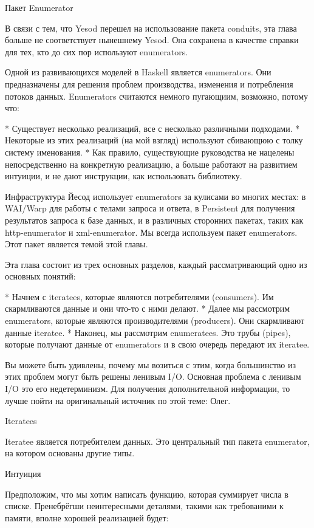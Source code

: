 Пакет Enumerator

В связи с тем, что Yesod перешел на использование пакета conduits, эта глава больше не соответствует нынешнему Yesod. Она сохранена в качестве справки для тех, кто до сих пор используют enumerators.

Одной из развивающихся моделей в Haskell является enumerators. Они предназначены для решения проблем производства, изменения и потребления потоков данных. Enumerators считаются немного пугающиим, возможно, потому что:

* Существует несколько реализаций, все с несколько различными подходами.
* Некоторые из этих реализаций (на мой взгляд) используют сбивающюю с толку систему именования.
* Как правило, существующие руководства не нацелены непосредственно на конкретную реализацию, а больше работают на развитием интуиции, и не дают инструкции, как использовать библиотеку.

Инфраструктура Йесод использует enumerators за кулисами во многих местах: в WAI/Warp для работы с телами запроса и ответа, в Persistent для получения результатов запроса к базе данных, и в различных сторонних пакетах, таких как http-enumerator и xml-enumerator. Мы всегда используем пакет enumerators. Этот пакет является темой этой главы.

Эта глава состоит из трех основных разделов, каждый рассматривающий одно из основных понятий:

* Начнем с iteratees, которые являются потребителями (consumers). Им скармливаются данные и они что-то с ними делают.
* Далее мы рассмотрим enumerators, которые являются производителями (producers). Они скармливают данные iteratee.
* Наконец, мы рассмотрим enumeratees. Это трубы (pipes), которые получают данные от enumerators и в свою очередь передают их iteratee.

Вы можете быть удивлены, почему мы возиться с этим, когда большинство из этих проблем могут быть решены ленивым I/O. Основная проблема с ленивым I/O это его недетерминизм. Для получения дополнительной информации, то лучше пойти на оригинальный источник по этой теме: Олег.

Iteratees


Iteratee является потребителем данных. Это центральный тип пакета enumerator, на котором основаны другие типы.

Интуиция

Предположим, что мы хотим написать функцию, которая суммирует числа в списке. Пренебрёгши неинтересными деталями, такими как требованими к памяти, вполне хорошей реализацией будет:

